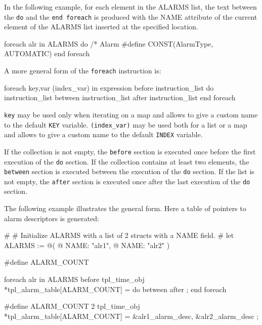 \documentclass[10pt,openright,twosides,final]{memoir}
\newcommand{\var}[1]{{\small\ttfamily #1}}
\newcommand{\gtlinline}[1]{\colorbox{light-blue}{\lstinline[language=gtl]{#1}}}
\begin{document}
In the following example, for each element in the \var{ALARMS} list, the text between the \lstinline{do} and the \lstinline{end foreach} is produced with the \var{NAME} attribute of the current element of the \var{ALARMS} list inserted at the specified location.

\begin{gtl}
foreach alr in ALARMS do
%
/* Alarm %
#define %
CONST(AlarmType, AUTOMATIC) %
%
end foreach
\end{gtl}

A more general form of the \lstinline{foreach} instruction is:

\begin{gtl}
foreach key,var (index_var) in expression
  before
    instruction_list
  do 
    instruction_list
  between
    instruction_list
  after 
    instruction_list
end foreach
\end{gtl}
\gtlinline{key} may be used only when iterating on a map and allows to give a custom name to the default \gtlinline{KEY} variable. \gtlinline{(index_var)} may be used both for a list or a map and allows to give a custom name to the default \gtlinline{INDEX} variable.

If the collection is not empty, the \gtlinline{before} section is executed once before the first execution of the \gtlinline{do} section. If the collection contains at least two elements, the \gtlinline{between} section is executed between the execution of the \gtlinline{do} section.  If the list is not empty, the \gtlinline{after} section is executed once after the last execution of the \gtlinline{do} section.

The following example illustrates the general form. Here a table of pointers to alarm descriptors is generated:

\begin{gtl}
#
# Initialize ALARMS with a list of 2 structs with a NAME field.
#
let ALARMS := @( @{ NAME: "alr1"}, @{ NAME: "alr2"} )

%
#define ALARM_COUNT %

foreach alr in ALARMS
  before %
tpl_time_obj *tpl_alarm_table[ALARM_COUNT] = {
%
  do %
  between %
%
  after %
};
%
end foreach
\end{gtl}
\begin{templateoutput}
#define ALARM_COUNT 2
tpl_time_obj *tpl_alarm_table[ALARM_COUNT] = {
  &alr1_alarm_desc,
  &alr2_alarm_desc
};
\end{templateoutput}
\end{document}
